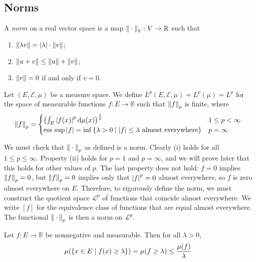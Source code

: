 \subsection{Norms}
\begin{definition}
	A \emph{norm} on a real vector space is a map \( \norm{{}\cdot{}}_V \colon V \to \mathbb R \) such that
	\begin{enumerate}
		\item \( \norm{\lambda v} = \abs{\lambda} \cdot \norm{v} \);
		\item \( \norm{u + v} \leq \norm{u} + \norm{v} \);
		\item \( \norm{v} = 0 \) if and only if \( v = 0 \).
	\end{enumerate}
\end{definition}
\begin{definition}
	Let \( (E, \mathcal E, \mu) \) be a measure space.
	We define \( L^p(E,\mathcal E,\mu) = L^p(\mu) = L^p \) for the space of measurable functions \( f \colon E \to \mathbb R \) such that \( \norm{f}_p \) is finite, where
	\[ \norm{f}_p = \begin{cases}
		\qty(\int_E \abs{f(x)}^p \dd{\mu(x)})^{\frac{1}{p}} & 1 \leq p < \infty \\
		\operatorname*{ess\ sup} \abs{f} = \inf \qty{\lambda > 0 \mid \abs{f} \leq \lambda \text{ almost everywhere}} & p = \infty
	\end{cases} \]
\end{definition}
We must check that \( \norm{{}\cdot{}}_p \) as defined is a norm.
Clearly (i) holds for all \( 1 \leq p \leq \infty \).
Property (ii) holds for \( p = 1 \) and \( p = \infty \), and we will prove later that this holds for other values of \( p \).
The last property does not hold: \( f = 0 \) implies \( \norm{f}_p = 0 \), but \( \norm{f}_p = 0 \) implies only that \( \abs{f}^p = 0 \) almost everywhere, so \( f \) is zero almost everywhere on \( E \).
Therefore, to rigorously define the norm, we must construct the quotient space \( \mathcal L^p \) of functions that coincide almost everywhere.
We write \( [f] \) for the equivalence class of functions that are equal almost everywhere.
The functional \( \norm{{}\cdot{}}_p \) is then a norm on \( \mathcal L^p \).
\begin{proposition}
	Let \( f \colon E \to \mathbb R \) be nonnegative and measurable.
	Then for all \( \lambda > 0 \),
	\[ \mu(\qty{x \in E \mid f(x) \geq \lambda}) = \mu(f \geq \lambda) \leq \frac{\mu(f)}{\lambda} \]
\end{proposition}
